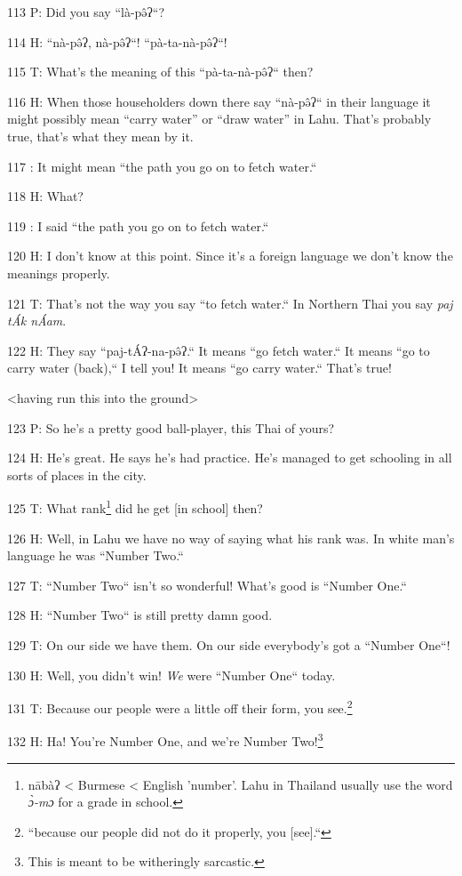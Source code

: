 113 P: Did you say ``là-pə̂ʔ``?

114 H: ``nà-pə̂ʔ, nà-pə̂ʔ``! ``pà-ta-nà-pə̂ʔ``!

115 T: What's the meaning of this ``pà-ta-nà-pə̂ʔ`` then?

116 H: When those householders down there say ``nà-pə̂ʔ`` in
their language it might possibly mean ``carry water'' or ``draw water'' in Lahu.
That's probably true, that's what they mean by it.

117    : It might mean ``the path you go on to fetch water.``

118 H: What?

119    : I said ``the path you go on to fetch water.``

120 H: I don't know at this point. Since it's a foreign language we don't know
the meanings properly.

121 T: That's not the way you say ``to fetch water.`` In Northern
Thai you say \textit{paj tÁk nÁam}.

122 H: They say ``paj-tÁʔ-na-pə̂ʔ.`` It means ``go
fetch water.`` It means ``go to carry water (back),`` I
tell you! It means ``go carry water.`` That's true!

<having run this into the ground>

123 P: So he's a pretty good ball-player, this Thai of yours?

124 H: He's great. He says he's had practice. He's managed to get schooling in
all sorts of places in the city.

125 T: What rank\footnote{nābàʔ < Burmese < English 'number'. Lahu in Thailand usually use the word \textit{ɔ̀-mɔ} for a grade in school.} did he get [in school] then?

126 H: Well, in Lahu we have no way of saying what his rank was. In white man's
language he was ``Number Two.``

127 T: ``Number Two`` isn't so wonderful! What's good is ``Number
One.``

128 H: ``Number Two`` is still pretty damn good.

129 T: On our side we have them. On our side everybody's got a ``Number
One``!

130 H: Well, you didn't win! \textit{We} were ``Number One`` today.

131 T: Because our people were a little off their form, you see.\footnote{``because our people did not do it properly, you [see].``}

132 H: Ha! You're Number One, and we're Number Two!\footnote{This is meant to be witheringly sarcastic.}

